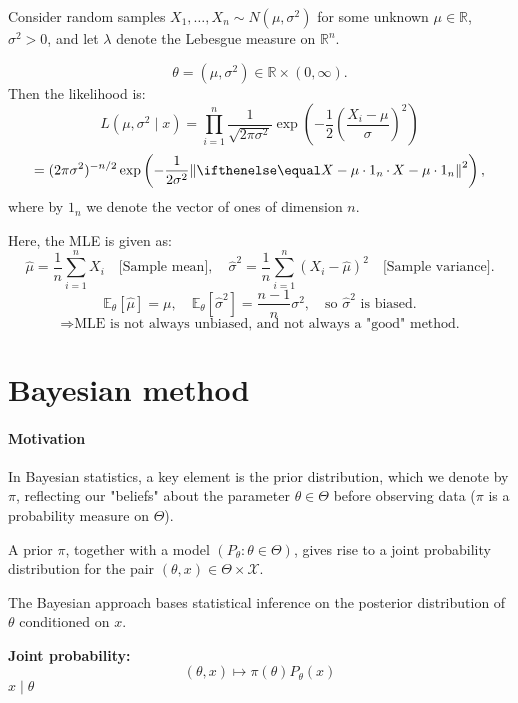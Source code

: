 \documentclass[open=any, 11pt,paper=A4]{scrreprt}
\begin{document}
\begin{example}\label{ex:normalmodel}
Consider random samples $X_1, \dots, X_n \sim N(\mu, \sigma^2)$ for some unknown $\mu \in \mathbb{R}$, $\sigma^2 > 0$, and let $\lambda$ denote the Lebesgue measure on $\mathbb{R}^n$.

\[
    \theta = (\mu, \sigma^2) \in \mathbb{R} \times (0, \infty).
\]
Then the likelihood is:
\[
    L(\mu, \sigma^2 \mid x) = \prod_{i=1}^{n} \frac{1}{\sqrt{2 \pi \sigma^2}} \exp \left( - \frac{1}{2} \left( \frac{X_i - \mu}{\sigma} \right)^2 \right)
\]
\[
    = (2 \pi \sigma^2)^{-n/2} \exp \left( - \frac{1}{2 \sigma^2} \norm{X-\mu\cdot 1_n}^2 \right),
\]
where by $1_n$ we denote the vector of ones of dimension $n$.

Here, the MLE is given as:
\[
    \hat{\mu} = \frac{1}{n} \sum_{i=1}^{n} X_i \quad \text{[Sample mean]}, \quad \hat{\sigma}^2 = \frac{1}{n} \sum_{i=1}^{n} (X_i - \hat{\mu})^2 \quad  \text{[Sample variance]}.
\]
\[
    \mathbb{E}_\theta[\hat{\mu}] = \mu, \quad \mathbb{E}_\theta[\hat{\sigma}^2] = \frac{n-1}{n} \sigma^2, \quad \text{so } \hat{\sigma}^2 \text{ is biased.}
\]
\[
    \Rightarrow \text{MLE is not always unbiased, and not always a "good" method.}
\]

\end{example}

\section{Bayesian method}

\paragraph{Motivation}
In Bayesian statistics, a key element is the prior distribution, which we denote by $\pi$, reflecting our "beliefs" about the parameter $\theta \in \Theta$ before observing data ($\pi$ is a probability measure on $\Theta$).

A prior $\pi$, together with a model $(P_\theta : \theta \in \Theta)$, gives rise to a joint probability distribution for the pair $(\theta, x) \in \Theta \times \mathcal{X}$.

The Bayesian approach bases statistical inference on the posterior distribution of $\theta$ conditioned on $x$.

\textbf{Joint probability:}
\[
    (\theta, x) \mapsto \pi(\theta) P_\theta(x)
\]
\hspace{4cm}  $x \mid \theta$
\end{document}
